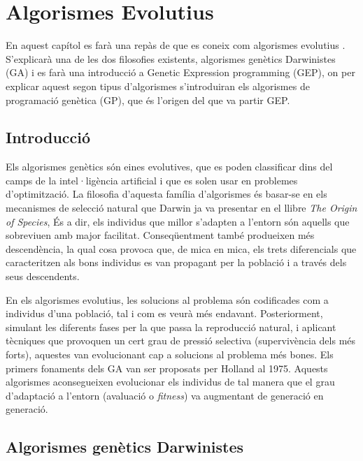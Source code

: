 %

\chapter{Algorismes Evolutius\label{GA}}

En aquest capítol es farà una repàs de que es coneix com algorismes evolutius
\cite{H75}. S'explicarà una de les dos filosofies existents,
algorismes genètics Darwinistes (GA) i es farà una introducció a Genetic
Expression programming (GEP), on per explicar aquest segon tipus d'algorismes
s'introduiran els algorismes de programació genètica (GP), que és l'origen del
que va partir GEP.

\section{Introducció}
Els algorismes genètics són eines evolutives, que es poden
classificar dins del camps de la intel·ligència artificial i que es solen usar
en problemes d'optimització. La filosofia d'aquesta família d'algorismes és
basar-se en els mecanismes de selecció natural que Darwin ja va presentar en el
llibre \emph{The Origin of Species}, És a dir, els individus que millor
s'adapten a l'entorn són aquells que sobreviuen amb major facilitat.
Conseqüentment també produeixen més descendència, la qual cosa provoca que, de
mica en mica, els trets diferencials que caracteritzen als bons individus es van
propagant per la població i a través dels seus descendents.

En els algorismes evolutius, les solucions al problema són codificades com a
individus d'una població, tal i com es veurà més endavant. Posteriorment,
simulant les diferents fases per la que passa la reproducció natural, i aplicant
tècniques que provoquen un cert grau de pressió selectiva (supervivència dels
més forts), aquestes van evolucionant cap a solucions al problema més bones.
Els primers fonaments dels GA van ser proposats per Holland \cite{H75} al 1975.
Aquests algorismes aconsegueixen evolucionar els individus de tal manera que el
grau d'adaptació a l'entorn (avaluació o \emph{fitness}) va augmentant de
generació en generació.

\section{Algorismes genètics Darwinistes}


